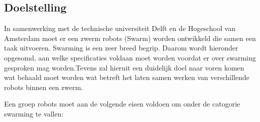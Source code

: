 \subsection{Doelstelling}
In samenwerking met de technische universiteit Delft en de Hogeschool van Amsterdam moet er een zwerm robots (Swarm) worden ontwikkeld die samen een taak uitvoeren. Swarming is een zeer breed begrip. Daarom wordt hieronder opgesomd, aan welke specificaties voldaan moet worden voordat er over swarming gesproken mag worden.Tevens zal hieruit een duidelijk doel naar voren komen wat behaald moet worden wat betreft het laten samen werken van verschillende robots binnen een zwerm.

Een groep robots moet aan de volgende eisen voldoen om onder de catogorie swarming te vallen:
